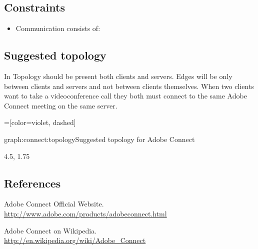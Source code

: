\documentclass[a4paper]{report}
\begin{document}
\subsection{Constraints}

\begin{itemize}
\item Communication consists of:
\end{itemize}

\subsection{Suggested topology}

In Topology should be present both clients and servers. Edges will be only between clients and servers and not between clients themselves. When two clients want to take a videoconference call they both must connect to the same Adobe Connect meeting on the same server.

=[color=violet, dashed]

\begin{Graph}{graph:connect:topology}{Suggested topology for Adobe Connect}  

      
  
  \begin{GraphLegend}{4.5, 1.75}
  \end{GraphLegend}
\end{Graph}

\subsection{References}

\renewcommand{\bibsection}{}
\begin{thebibliography}{1}

Adobe Connect Official Website.
\\ \url{http://www.adobe.com/products/adobeconnect.html}

Adobe Connect on Wikipedia.
\\ \url{http://en.wikipedia.org/wiki/Adobe_Connect}

\end{thebibliography}
\end{document}
